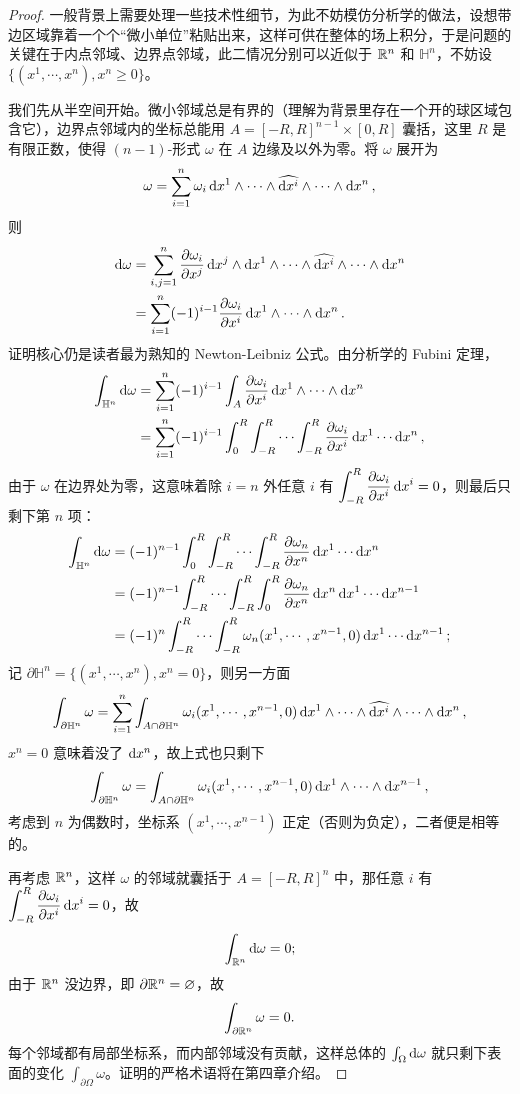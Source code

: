 \begin{proof}
    一般背景上需要处理一些技术性细节，为此不妨模仿分析学的做法，设想带边区域靠着一个个“微小单位”粘贴出来，这样可供在整体的场上积分，于是问题的关键在于内点邻域、边界点邻域，此二情况分别可以近似于 $\mathbb{R}^n$ 和 $\mathbb H^{n}$，不妨设 $\{(x^1,\cdots,x^n),x^n\geqslant 0\}$。
    
    我们先从半空间开始。微小邻域总是有界的（理解为背景里存在一个开的球区域包含它），边界点邻域内的坐标总能用 $A=[-R,R]^{n-1}\times[0,R]$ 囊括，这里 $R$ 是有限正数，使得 $(n-1)$-形式 $\omega$ 在 $A$ 边缘及以外为零。将 $\omega$ 展开为
    \[
    \omega=\sum_{i=1}^n\omega_i \dd{x^1}\wedge \cdots \wedge \widehat{\dd{x^i}}\wedge \cdots \wedge \dd{x^n},
    \]
    则
    \begin{align*}
        \dd\omega&=\sum_{i,j=1}^n\pdv{\omega_i}{x^j}\dd{x^j}\wedge \dd{x^1}\wedge \cdots \wedge \widehat{\dd{x^i}}\wedge \cdots \wedge \dd{x^n}\\
        &=\sum_{i=1}^n(-1)^{i-1}\pdv{\omega_i}{x^i}\dd{x^1}\wedge \cdots \wedge \dd{x^n}.
    \end{align*}
    证明核心仍是读者最为熟知的 Newton-Leibniz 公式。由分析学的 Fubini 定理，
    \begin{align*}
        \int_{\mathbb H^{n}}\dd\omega&=\sum_{i=1}^n(-1)^{i-1}\int_A\pdv{\omega_i}{x^i}\dd{x^1}\wedge \cdots \wedge \dd{x^n}\\
        &=\sum_{i=1}^n(-1)^{i-1}\int_0^R\int_{-R}^{R}\cdots\int_{-R}^{R}\pdv{\omega_i}{x^i}\dd{x^1}\cdots \dd{x^n},
    \end{align*}
    由于 $\omega$ 在边界处为零，这意味着除 $i=n$ 外任意 $i$ 有 $\displaystyle\int_{-R}^{R}\pdv{\omega_i}{x^i}\dd{x^i}=0$，则最后只剩下第 $n$ 项：
    \begin{align*}
        \int_{\mathbb H^{n}}\dd\omega&=(-1)^{n-1}\int_0^R\int_{-R}^{R}\cdots\int_{-R}^{R}\pdv{\omega_n}{x^n}\dd{x^1}\cdots \dd{x^{n}}\\
        &=(-1)^{n-1}\int_{-R}^{R}\cdots\int_{-R}^{R}\int_0^R\pdv{\omega_n}{x^n}\dd{x^n}\dd{x^1}\cdots \dd{x^{n-1}}\\
        &=(-1)^{n}\int_{-R}^{R}\cdots\int_{-R}^{R}\omega_n(x^1,\cdots,x^{n-1},0)\dd{x^1}\cdots \dd{x^{n-1}};
    \end{align*}
    记 $\partial\mathbb H^{n}=\{(x^1,\cdots,x^n),x^n=0\}$，则另一方面
    \[
    \int_{\partial\mathbb H^{n}}\omega=\sum_{i=1}^n\int_{A\cap\partial\mathbb H^{n}} \omega_i(x^1,\cdots,x^{n-1},0)\dd{x^1}\wedge \cdots \wedge \widehat{\dd{x^i}}\wedge \cdots \wedge \dd{x^n},
    \]
    $x^n=0$ 意味着没了 $\dd{x^n}$，故上式也只剩下
    \[
    \int_{\partial\mathbb H^{n}}\omega=\int_{A\cap\partial\mathbb H^{n}} \omega_i(x^1,\cdots,x^{n-1},0)\dd{x^1}\wedge \cdots \wedge \dd{x^{n-1}},
    \]
    考虑到 $n$ 为偶数时，坐标系 $(x^1,\cdots,x^{n-1})$ 正定（否则为负定），二者便是相等的。

    再考虑 $\mathbb{R}^n$，这样 $\omega$ 的邻域就囊括于 $A=[-R,R]^n$ 中，那任意 $i$ 有 $\displaystyle\int_{-R}^{R}\pdv{\omega_i}{x^i}\dd{x^i}=0$，故
    \[
    \int_{\mathbb{R}^{n}}\dd\omega=0;
    \]
    由于 $\mathbb{R}^n$ 没边界，即 $\partial\mathbb{R}^n=\varnothing$，故
    \[
    \int_{\partial\mathbb{R}^{n}}\omega=0.
    \]
    每个邻域都有局部坐标系，而内部邻域没有贡献，这样总体的 $\int_\Omega\dd\omega$ 就只剩下表面的变化 $\int_{\partial\Omega}\omega$。证明的严格术语将在第四章介绍。
\end{proof}
